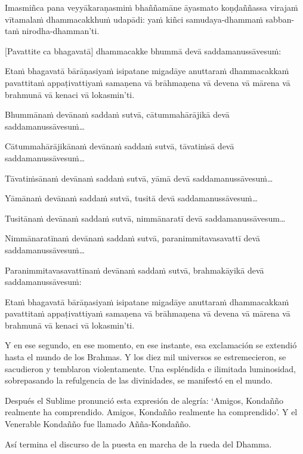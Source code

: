 \clearpage

\paliText
\markboth{\paliTitle}{\rightmark}

Imasmiñca pana veyyākaraṇasmiṁ bhaññamāne āyasmato koṇḍaññassa virajaṁ
vītamalaṁ dhammacakkhuṁ udapādi: yaṁ kiñci samudaya-dhammaṁ sabban-taṁ
nirodha-dhamman'ti.

[Pavattite ca bhagavatā] dhammacakke bhummā devā saddamanussāvesuṁ:

Etaṁ bhagavatā bārāṇasiyaṁ isipatane migadāye anuttaraṁ dhammacakkaṁ
pavattitaṁ appaṭivattiyaṁ samaṇena vā brāhmaṇena vā devena vā mārena vā
brahmunā vā kenaci vā lokasmin'ti.

Bhummānaṁ devānaṁ saddaṁ sutvā, cātummahārājikā devā
saddamanussāvesuṁ\ldots

Cātummahārājikānaṁ devānaṁ saddaṁ sutvā, tāvatiṁsā devā
saddamanussāvesuṁ\ldots

Tāvatiṁsānaṁ devānaṁ saddaṁ sutvā, yāmā devā saddamanussāvesuṁ\ldots

Yāmānaṁ devānaṁ saddaṁ sutvā, tusitā devā saddamanussāvesuṁ\ldots

Tusitānaṁ devānaṁ saddaṁ sutvā, nimmānaratī devā saddamanussāvesum\ldots

Nimmānaratīnaṁ devānaṁ saddaṁ sutvā, paranimmitavasavattī devā
saddamanussāvesuṁ\ldots

Paranimmitavasavattīnaṁ devānaṁ saddaṁ sutvā, brahmakāyikā devā
saddamanussāvesuṁ:

Etaṁ bhagavatā bārāṇasiyaṁ isipatane migadāye anuttaraṁ dhammacakkaṁ
pavattitaṁ appaṭivattiyaṁ samaṇena vā brāhmaṇena vā devena vā mārena vā
brahmunā vā kenaci vā lokasmin'ti.

\clearpage

\englishText
\markboth{\englishTitle}{\rightmark}

Y en ese segundo, en ese momento, en ese instante, esa exclamación se extendió hasta el mundo de los Brahmas. Y los diez mil universos se estremecieron, se sacudieron y temblaron violentamente. Una espléndida e ilimitada luminosidad, sobrepasando la refulgencia de las divinidades, se manifestó en el mundo.

Después el Sublime pronunció esta expresión de alegría: ‘Amigos, Kondañño realmente ha comprendido. Amigos, Kondañño realmente ha comprendido’. Y el Venerable Kondañño fue llamado Añña-Kondañño.


Así termina el discurso de la puesta en marcha de la rueda del Dhamma.

\clearpage

\paliText
\markboth{\paliTitle}{\rightmark}

